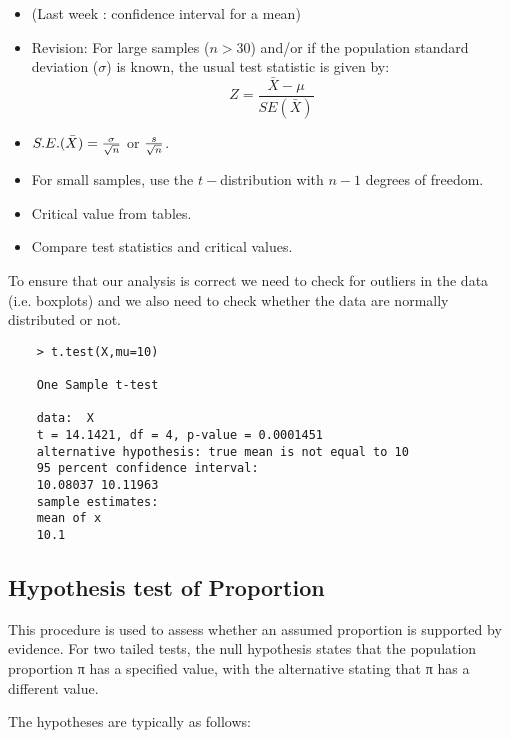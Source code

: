 \begin{itemize}
	\item (Last week : confidence interval for a mean) \item Revision:
	For large samples ($n > 30$) and/or if the population standard
	deviation ($\sigma$) is known, the usual test statistic is given
	by: \[Z =\frac{\bar{X} - \mu}{SE(\bar{X})}\]
	
	\item $S.E.(\bar{X}) = { \sigma \over \sqrt{n}} $ or ${s \over \sqrt{n}}$. 
	\item For small samples, use the $t-$distribution with $n-1$ degrees of freedom.
	\item Critical value from tables.
	\item Compare test statistics and critical values.
\end{itemize}

To ensure that our analysis is correct we need to check for
outliers in the data (i.e. boxplots) and we also need to check
whether the data are normally distributed or not.

\begin{framed}
	\begin{verbatim}
	> t.test(X,mu=10)
	
	One Sample t-test
	
	data:  X 
	t = 14.1421, df = 4, p-value = 0.0001451
	alternative hypothesis: true mean is not equal to 10 
	95 percent confidence interval:
	10.08037 10.11963 
	sample estimates:
	mean of x 
	10.1 
	\end{verbatim}
\end{framed}




\newpage




\subsection{Hypothesis test of Proportion}
This procedure is used to assess whether an assumed proportion is supported by evidence. For two tailed tests, the null hypothesis states that the population proportion  π has a specified value, with the alternative stating that π has a different value. 

The hypotheses are typically as follows:   

